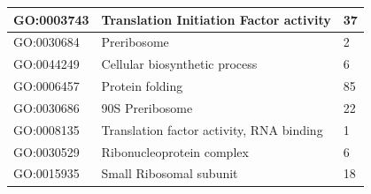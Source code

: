 \documentclass[a4,center]{NAR} %
\begin{document}
\begin{table}[h]
{\begin{tabular}{|l|l|l|}
\hline
GO:0003743 &Translation Initiation Factor activity &37\\
\hline
GO:0030684&Preribosome&2\\
\hline
GO:0044249&Cellular biosynthetic process&6\\
\hline
GO:0006457&Protein folding&85\\
\hline
GO:0030686&90S Preribosome&22\\
\hline
GO:0008135&Translation factor activity, RNA binding&1\\
\hline
GO:0030529&Ribonucleoprotein complex&6\\
\hline
GO:0015935&Small Ribosomal subunit
&18\\
\hline
\end{tabular}%
}
 
\end{table}
\end{document}
